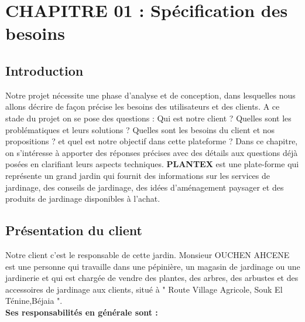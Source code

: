 \documentclass[a4paper,12pt,oneside]{article}
\begin{document}
\section{CHAPITRE 01 : Spécification des besoins}
{\fontsize{15}{20}\selectfont 
\subsection{Introduction}

\hspace{1cm}Notre projet nécessite une phase d’analyse et
de conception, dans lesquelles nous allons
décrire de façon précise les besoins des
utilisateurs et des clients.
A ce stade du projet on se pose des questions :
Qui est notre client ? Quelles sont les
problématiques et leurs solutions ? Quelles sont
les besoins du client et nos propositions ? et quel
est notre objectif dans cette plateforme ?
Dans ce chapitre, on s’intéresse à apporter des
réponses précises avec des détails aux
questions déjà posées en clarifiant leurs aspects
techniques.
\textbf{PLANTEX} est une plate-forme qui représente un
grand jardin qui fournit des informations sur les
services de jardinage, des conseils de jardinage,
des idées d'aménagement paysager et des
produits de jardinage disponibles à l'achat.

\subsection{Présentation du client}

\hspace{1cm}Notre client c'est le responsable de cette jardin.
Monsieur OUCHEN AHCENE est une personne qui
travaille dans une pépinière, un magasin de
jardinage ou une jardinerie et qui est chargée de
vendre des plantes, des arbres, des arbustes et
des accessoires de jardinage aux clients, situé à "
Route Village Agricole, Souk El Ténine,Béjaia ".\\
\textbf{Ses responsabilités en générale sont :}

}
\end{document}
